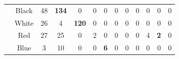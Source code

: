 \begin{table}[]
{\begin{tabular}{ccccccccccccc}
\multicolumn{1}{|l|}{}                                & \multicolumn{1}{c|}{Black}     & \multicolumn{1}{c|}{48}                                   & \multicolumn{1}{c|}{\cellcolor[HTML]{32CB00}\textbf{134}} & \multicolumn{1}{c|}{0}                                    & \multicolumn{1}{c|}{0}                                  & \multicolumn{1}{c|}{0}                                  & \multicolumn{1}{c|}{0}                                  & \multicolumn{1}{c|}{0}                                  & \multicolumn{1}{c|}{0}                                  & \multicolumn{1}{c|}{0}                                  & \multicolumn{1}{c|}{0}                                  & \multicolumn{1}{c|}{0}                                  \\ \cline{2-13} 
\multicolumn{1}{|l|}{}                                & \multicolumn{1}{c|}{White}     & \multicolumn{1}{c|}{26}                                   & \multicolumn{1}{c|}{4}                                    & \multicolumn{1}{c|}{\cellcolor[HTML]{32CB00}\textbf{120}} & \multicolumn{1}{c|}{0}                                  & \multicolumn{1}{c|}{0}                                  & \multicolumn{1}{c|}{0}                                  & \multicolumn{1}{c|}{0}                                  & \multicolumn{1}{c|}{0}                                  & \multicolumn{1}{c|}{0}                                  & \multicolumn{1}{c|}{0}                                  & \multicolumn{1}{c|}{0}                                  \\ \cline{2-13} 
\multicolumn{1}{|l|}{}                                & \multicolumn{1}{c|}{Red}       & \multicolumn{1}{c|}{27}                                   & \multicolumn{1}{c|}{25}                                   & \multicolumn{1}{c|}{0}                                    & \multicolumn{1}{c|}{2}                                  & \multicolumn{1}{c|}{0}                                  & \multicolumn{1}{c|}{0}                                  & \multicolumn{1}{c|}{0}                                  & \multicolumn{1}{c|}{0}                                  & \multicolumn{1}{c|}{4}                                  & \multicolumn{1}{c|}{\cellcolor[HTML]{FE0000}\textbf{2}} & \multicolumn{1}{c|}{0}                                  \\ \cline{2-13} 
\multicolumn{1}{|l|}{}                                & \multicolumn{1}{c|}{Blue}      & \multicolumn{1}{c|}{3}                                    & \multicolumn{1}{c|}{10}                                   & \multicolumn{1}{c|}{0}                                    & \multicolumn{1}{c|}{0}                                  & \multicolumn{1}{c|}{\cellcolor[HTML]{32CB00}\textbf{6}} & \multicolumn{1}{c|}{0}                                  & \multicolumn{1}{c|}{0}                                  & \multicolumn{1}{c|}{0}                                  & \multicolumn{1}{c|}{0}                                  & \multicolumn{1}{c|}{0}                                  & \multicolumn{1}{c|}{0}                                  \\ \cline{2-13} 

\end{tabular}}
\end{table}
